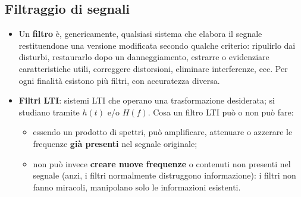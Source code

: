 \documentclass[12pt, a4paper]{article}
\begin{document}
\subsection{Filtraggio di segnali}
\begin{itemize}
    \item Un \textbf{filtro} è, genericamente, qualsiasi sistema che elabora il segnale restituendone una versione modificata secondo qualche criterio: ripulirlo dai disturbi, restaurarlo dopo un danneggiamento, estrarre o evidenziare caratteristiche utili, correggere distorsioni, eliminare interferenze, ecc. Per ogni finalità esistono più filtri, con accuratezza diversa.
    \item \textbf{Filtri LTI}: sistemi LTI che operano una trasformazione desiderata; si studiano tramite $h(t)$ e/o $H(f)$. Cosa un filtro LTI può o non può fare:
    \begin{itemize}
        \item essendo un prodotto di spettri, può amplificare, attenuare o azzerare le frequenze \textbf{già presenti} nel segnale originale;
        \item non può invece \textbf{creare nuove frequenze} o contenuti non presenti nel segnale (anzi, i filtri normalmente distruggono informazione): i filtri non fanno miracoli, manipolano solo le informazioni esistenti.
    \end{itemize}
\end{itemize}
\end{document}
